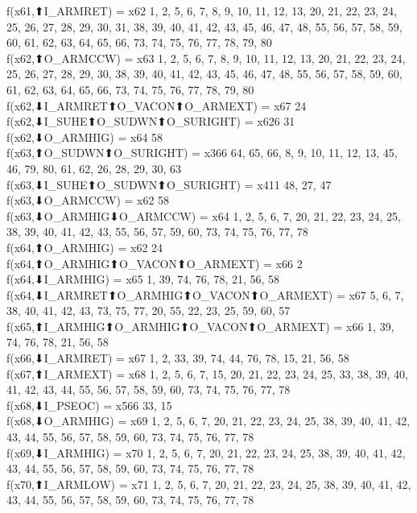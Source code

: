 f(x61,⬆I_ARMRET) = x62 {1, 2, 5, 6, 7, 8, 9, 10, 11, 12, 13, 20, 21, 22, 23, 24, 25, 26, 27, 28, 29, 30, 31, 38, 39, 40, 41, 42, 43, 45, 46, 47, 48, 55, 56, 57, 58, 59, 60, 61, 62, 63, 64, 65, 66, 73, 74, 75, 76, 77, 78, 79, 80} \\
f(x62,⬆O_ARMCCW) = x63 {1, 2, 5, 6, 7, 8, 9, 10, 11, 12, 13, 20, 21, 22, 23, 24, 25, 26, 27, 28, 29, 30, 38, 39, 40, 41, 42, 43, 45, 46, 47, 48, 55, 56, 57, 58, 59, 60, 61, 62, 63, 64, 65, 66, 73, 74, 75, 76, 77, 78, 79, 80} \\
f(x62,⬇I_ARMRET⬆O_VACON⬆O_ARMEXT) = x67 {24} \\
f(x62,⬇I_SUHE⬆O_SUDWN⬆O_SURIGHT) = x626 {31} \\
f(x62,⬇O_ARMHIG) = x64 {58} \\
f(x63,⬆O_SUDWN⬆O_SURIGHT) = x366 {64, 65, 66, 8, 9, 10, 11, 12, 13, 45, 46, 79, 80, 61, 62, 26, 28, 29, 30, 63} \\
f(x63,⬇I_SUHE⬆O_SUDWN⬆O_SURIGHT) = x411 {48, 27, 47} \\
f(x63,⬇O_ARMCCW) = x62 {58} \\
f(x63,⬇O_ARMHIG⬇O_ARMCCW) = x64 {1, 2, 5, 6, 7, 20, 21, 22, 23, 24, 25, 38, 39, 40, 41, 42, 43, 55, 56, 57, 59, 60, 73, 74, 75, 76, 77, 78} \\
f(x64,⬆O_ARMHIG) = x62 {24} \\
f(x64,⬆O_ARMHIG⬆O_VACON⬆O_ARMEXT) = x66 {2} \\
f(x64,⬇I_ARMHIG) = x65 {1, 39, 74, 76, 78, 21, 56, 58} \\
f(x64,⬇I_ARMRET⬆O_ARMHIG⬆O_VACON⬆O_ARMEXT) = x67 {5, 6, 7, 38, 40, 41, 42, 43, 73, 75, 77, 20, 55, 22, 23, 25, 59, 60, 57} \\
f(x65,⬆I_ARMHIG⬆O_ARMHIG⬆O_VACON⬆O_ARMEXT) = x66 {1, 39, 74, 76, 78, 21, 56, 58} \\
f(x66,⬇I_ARMRET) = x67 {1, 2, 33, 39, 74, 44, 76, 78, 15, 21, 56, 58} \\
f(x67,⬆I_ARMEXT) = x68 {1, 2, 5, 6, 7, 15, 20, 21, 22, 23, 24, 25, 33, 38, 39, 40, 41, 42, 43, 44, 55, 56, 57, 58, 59, 60, 73, 74, 75, 76, 77, 78} \\
f(x68,⬇I_PSEOC) = x566 {33, 15} \\
f(x68,⬇O_ARMHIG) = x69 {1, 2, 5, 6, 7, 20, 21, 22, 23, 24, 25, 38, 39, 40, 41, 42, 43, 44, 55, 56, 57, 58, 59, 60, 73, 74, 75, 76, 77, 78} \\
f(x69,⬇I_ARMHIG) = x70 {1, 2, 5, 6, 7, 20, 21, 22, 23, 24, 25, 38, 39, 40, 41, 42, 43, 44, 55, 56, 57, 58, 59, 60, 73, 74, 75, 76, 77, 78} \\
f(x70,⬆I_ARMLOW) = x71 {1, 2, 5, 6, 7, 20, 21, 22, 23, 24, 25, 38, 39, 40, 41, 42, 43, 44, 55, 56, 57, 58, 59, 60, 73, 74, 75, 76, 77, 78} \\

